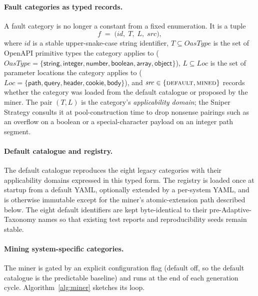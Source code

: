 \documentclass[conference]{IEEEtran}
\begin{document}
\paragraph{Fault categories as typed records.}
A fault category is no longer a constant from a fixed enumeration. It is a tuple
\[
  f \;=\; \big(\mathit{id},\; T,\; L,\; \mathit{src}\big),
\]
where $\mathit{id}$ is a stable upper-snake-case string identifier, $T \subseteq \mathit{OasType}$ is the set of OpenAPI primitive types the category applies to ($\mathit{OasType} = \{\textsf{string}, \textsf{integer}, \textsf{number}, \textsf{boolean}, \textsf{array}, \textsf{object}\}$), $L \subseteq \mathit{Loc}$ is the set of parameter locations the category applies to ($\mathit{Loc} = \{\textsf{path}, \textsf{query}, \textsf{header}, \textsf{cookie}, \textsf{body}\}$), and $\mathit{src} \in \{\textsc{default}, \textsc{mined}\}$ records whether the category was loaded from the default catalogue or proposed by the miner. The pair $(T, L)$ is the category's \emph{applicability domain}; the Sniper Strategy consults it at pool-construction time to drop nonsense pairings such as an overflow on a boolean or a special-character payload on an integer path segment.

\paragraph{Default catalogue and registry.}
The default catalogue reproduces the eight legacy categories with their applicability domains expressed in this typed form. The registry is loaded once at startup from a default YAML, optionally extended by a per-system YAML, and is otherwise immutable except for the miner's atomic-extension path described below. The eight default identifiers are kept byte-identical to their pre-Adaptive-Taxonomy names so that existing test reports and reproducibility seeds remain stable.

\paragraph{Mining system-specific categories.}
The miner is gated by an explicit configuration flag (default off, so the default catalogue is the predictable baseline) and runs at the end of each generation cycle. Algorithm~\ref{alg:miner} sketches its loop.
\end{document}
